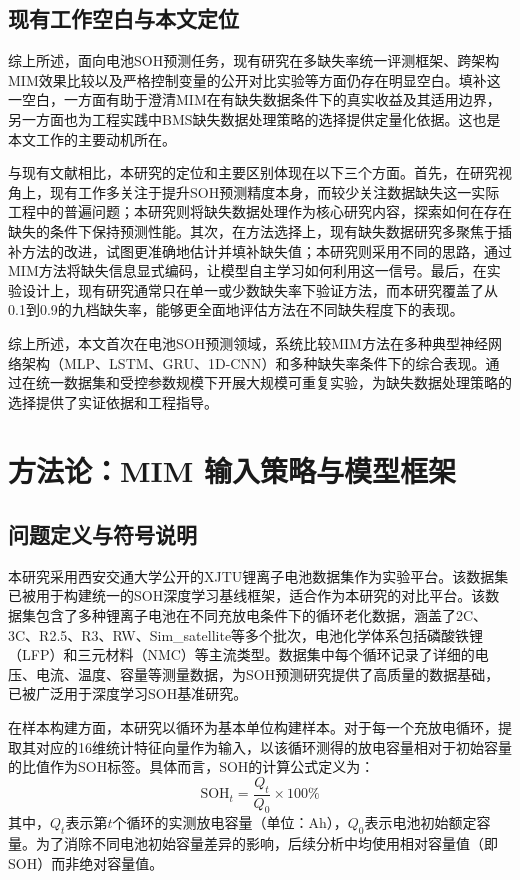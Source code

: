 \documentclass[10pt,a4paper]{ctexart}
\begin{document}
\subsection{现有工作空白与本文定位}

综上所述，面向电池SOH预测任务，现有研究在多缺失率统一评测框架、跨架构MIM效果比较以及严格控制变量的公开对比实验等方面仍存在明显空白。填补这一空白，一方面有助于澄清MIM在有缺失数据条件下的真实收益及其适用边界，另一方面也为工程实践中BMS缺失数据处理策略的选择提供定量化依据。这也是本文工作的主要动机所在。

与现有文献相比，本研究的定位和主要区别体现在以下三个方面。首先，在研究视角上，现有工作多关注于提升SOH预测精度本身，而较少关注数据缺失这一实际工程中的普遍问题；本研究则将缺失数据处理作为核心研究内容，探索如何在存在缺失的条件下保持预测性能。其次，在方法选择上，现有缺失数据研究多聚焦于插补方法的改进，试图更准确地估计并填补缺失值；本研究则采用不同的思路，通过MIM方法将缺失信息显式编码，让模型自主学习如何利用这一信号。最后，在实验设计上，现有研究通常只在单一或少数缺失率下验证方法，而本研究覆盖了从0.1到0.9的九档缺失率，能够更全面地评估方法在不同缺失程度下的表现。

综上所述，本文首次在电池SOH预测领域，系统比较MIM方法在多种典型神经网络架构（MLP、LSTM、GRU、1D-CNN）和多种缺失率条件下的综合表现。通过在统一数据集和受控参数规模下开展大规模可重复实验，为缺失数据处理策略的选择提供了实证依据和工程指导。

\section{方法论：MIM 输入策略与模型框架}\label{sec:method}

\subsection{问题定义与符号说明}

本研究采用西安交通大学公开的XJTU锂离子电池数据集作为实验平台\cite{wang2024open,duan2025lithium}。该数据集已被用于构建统一的SOH深度学习基线框架\cite{wang2024open}，适合作为本研究的对比平台。该数据集包含了多种锂离子电池在不同充放电条件下的循环老化数据，涵盖了2C、3C、R2.5、R3、RW、Sim\_satellite等多个批次，电池化学体系包括磷酸铁锂（LFP）和三元材料（NMC）等主流类型。数据集中每个循环记录了详细的电压、电流、温度、容量等测量数据，为SOH预测研究提供了高质量的数据基础，已被广泛用于深度学习SOH基准研究\cite{wang2024pinn}。

在样本构建方面，本研究以循环为基本单位构建样本。对于每一个充放电循环，提取其对应的16维统计特征向量作为输入，以该循环测得的放电容量相对于初始容量的比值作为SOH标签。具体而言，SOH的计算公式定义为：
\begin{equation}
    \text{SOH}_t = \frac{Q_t}{Q_0} \times 100\%
\end{equation}
其中，$Q_t$表示第$t$个循环的实测放电容量（单位：Ah），$Q_0$表示电池初始额定容量。为了消除不同电池初始容量差异的影响，后续分析中均使用相对容量值（即SOH）而非绝对容量值。
\end{document}
